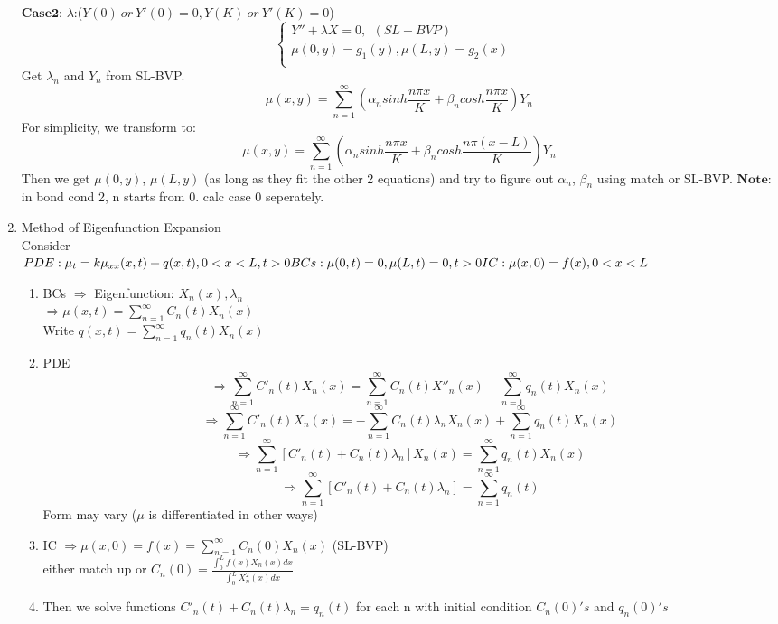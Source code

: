 \documentclass[10pt]{article}
\begin{document}
\begin{multicols}{2}
\begin{enumerate}
		$\mathbf{Case2}$: $\lambda$:($Y(0) \ or \ Y'(0) = 0, Y(K) \ or \ Y'(K) = 0$)\\
		\begin{equation}
		\left\{
		\begin{array}{lr}
		Y''+\lambda X = 0, \ \ (SL-BVP)&\\
		\mu(0, y) = g_1(y), \mu(L, y) = g_2(x)\\
		\end{array}
		\right.
		\end{equation}
		Get $\lambda_n$ and $Y_n$ from SL-BVP.
		$$\mu(x,y) = \sum_{n = 1}^{\infty} (\alpha_n sinh\frac{n \pi x}{K} + \beta_n cosh\frac{n \pi x}{K}) Y_n$$
		For simplicity, we transform to:\\
		$$\mu(x,y) = \sum_{n = 1}^{\infty} (\alpha_n sinh\frac{n \pi x}{K} + \beta_n cosh\frac{n \pi (x-L)}{K}) Y_n$$
		Then we get $\mu(0, y)$, $\mu(L, y)$ (as long as they fit the other 2 equations) and try to figure out $\alpha_n$, $\beta_n$ using match or SL-BVP. $\mathbf{Note}:$ in bond cond 2, n starts from 0. calc case 0 seperately.
		
	\item Method of Eigenfunction Expansion\\
		Consider\\
		$PDE: \mu_t = k\mu_{xx}(x,t) + q(x,t), 0<x<L, t > 0\\
		BCs: \mu(0,t) = 0, \mu(L,t) = 0, t > 0\\
		IC: \mu(x, 0) = f(x), 0<x<L$
		\begin{enumerate}
			\item BCs $\Rightarrow$ Eigenfunction:  $X_n(x), \lambda_n$\\
			$\Rightarrow \mu(x,t) = \sum_{n = 1}^{\infty}C_n(t)X_n(x)$\\
			Write $q(x,t) = \sum_{n = 1}^{\infty}q_n(t)X_n(x)$
			\item PDE $$\Rightarrow \sum_{n = 1}^{\infty}C'_n(t)X_n(x) = \sum_{n = 1}^{\infty}C_n(t)X''_n(x)+\sum_{n = 1}^{\infty}q_n(t)X_n(x)$$
			$$\Rightarrow \sum_{n = 1}^{\infty}C'_n(t)X_n(x) = -\sum_{n = 1}^{\infty}C_n(t)\lambda_n X_n(x)+\sum_{n = 1}^{\infty}q_n(t)X_n(x)$$
			$$\Rightarrow \sum_{n = 1}^{\infty}[C'_n(t)+C_n(t)\lambda_n]X_n(x) = \sum_{n = 1}^{\infty}q_n(t)X_n(x)$$
			$$\Rightarrow \sum_{n = 1}^{\infty}[C'_n(t)+C_n(t)\lambda_n] = \sum_{n = 1}^{\infty}q_n(t)$$
			Form may vary ($\mu$ is differentiated in other ways)
			\item IC $\Rightarrow \mu(x,0) = f(x) = \sum_{n=1}^{\infty}C_n(0)X_n(x)$ (SL-BVP)\\
			either match up or $C_n(0) = \frac{\int_{0}^{L}f(x)X_n(x)dx}{\int_{0}^{L}X_n^2(x)dx}$
			\item Then we solve functions $C'_n(t)+C_n(t)\lambda_n = q_n(t)$ for each n with initial condition $C_n(0)'s$ and $q_n(0)'s$
		\end{enumerate}
	

\end{enumerate}
\end{multicols}
\end{document}
